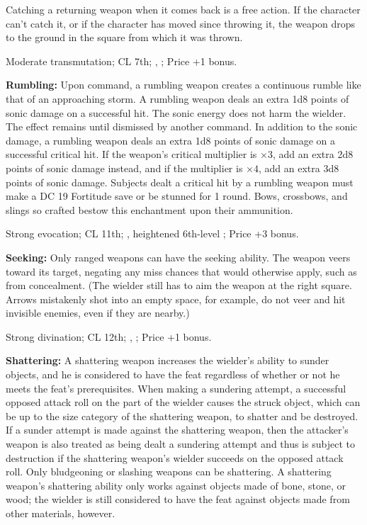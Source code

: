 Catching a returning weapon when it comes back is a free action. If the character can't catch it, or if the character has moved since throwing it, the weapon drops to the ground in the square from which it was thrown.

Moderate transmutation; CL 7th; , ; Price +1 bonus.

\textbf{Rumbling:} Upon command, a rumbling weapon creates a continuous rumble like that of an approaching storm. A rumbling weapon deals an extra 1d8 points of sonic damage on a successful hit. The sonic energy does not harm the wielder. The effect remains until dismissed by another command. In addition to the sonic damage, a rumbling weapon deals an extra 1d8 points of sonic damage on a successful critical hit. If the weapon’s critical multiplier is $\times3$, add an extra 2d8 points of sonic damage instead, and if the multiplier is $\times4$, add an extra 3d8 points of sonic damage. Subjects dealt a critical hit by a rumbling weapon must make a DC 19 Fortitude save or be stunned for 1 round. Bows, crossbows, and slings so crafted bestow this enchantment upon their ammunition.

Strong evocation; CL 11th; , heightened 6th-level ; Price +3 bonus.

\textbf{Seeking:} Only ranged weapons can have the seeking ability. The weapon veers toward its target, negating any miss chances that would otherwise apply, such as from concealment. (The wielder still has to aim the weapon at the right square. Arrows mistakenly shot into an empty space, for example, do not veer and hit invisible enemies, even if they are nearby.)

Strong divination; CL 12th; , ; Price +1 bonus.

\textbf{Shattering:} A shattering weapon increases the wielder’s ability to sunder objects, and he is considered to have the  feat regardless of whether or not he meets the feat’s prerequisites. When making a sundering attempt, a successful opposed attack roll on the part of the wielder causes the struck object, which can be up to the size category of the shattering weapon, to shatter and be destroyed. If a sunder attempt is made against the shattering weapon, then the attacker’s weapon is also treated as being dealt a sundering attempt and thus is subject to destruction if the shattering weapon’s wielder  succeeds on the opposed attack roll. Only bludgeoning or slashing weapons can be shattering. A shattering weapon’s shattering ability only works against objects made of bone, stone, or wood; the wielder is still considered to have the  feat against objects made from other materials, however.

